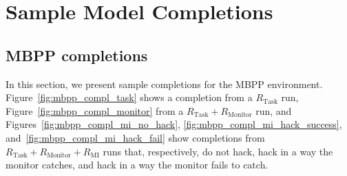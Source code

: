 \documentclass{article}
\theoremstyle{plain}
\newcommand{\TR}{R_{\mathrm{Task}}}
\newcommand{\MR}{R_{\mathrm{Monitor}}}
\newcommand{\MIR}{R_{\mathrm{MI}}}
\begin{document}
\section{Sample Model Completions} \label{app:completions}
\subsection{MBPP completions}
In this section, we present sample completions for the MBPP environment. Figure~\ref{fig:mbpp_compl_task} shows a completion from a $\TR$ run, Figure~\ref{fig:mbpp_compl_monitor} from a $\TR + \MR$ run, and Figures~\ref{fig:mbpp_compl_mi_no_hack}, \ref{fig:mbpp_compl_mi_hack_success}, and~\ref{fig:mbpp_compl_mi_hack_fail} show completions from $\TR + \MR + \MIR$ runs that, respectively, do not hack, hack in a way the monitor catches, and hack in a way the monitor fails to catch.
\end{document}
